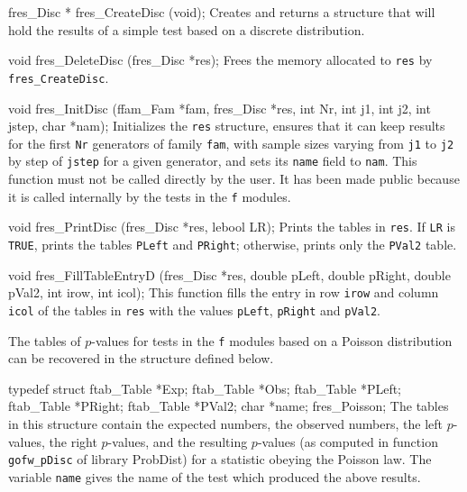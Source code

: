 fres_Disc * fres_CreateDisc (void);
\endcode
 \tab 
  Creates and returns a structure that will hold the results
  of a simple test based on a discrete distribution. 
 \endtab
\code


void fres_DeleteDisc (fres_Disc *res);
\endcode
 \tab 
  Frees the memory allocated to {\tt res} by {\tt fres\_CreateDisc}.
 \endtab
\code
\hide

void fres_InitDisc (ffam_Fam *fam, fres_Disc *res,
                    int Nr, int j1, int j2, int jstep, char *nam);
\endcode
 \tab 
   Initializes the {\tt res} structure, ensures that it can keep results
   for the first {\tt Nr} generators of family {\tt fam}, with sample sizes
   varying from {\tt j1} to {\tt j2} by step of {\tt jstep} for a given
   generator, and sets its {\tt name} field to {\tt nam}. This function
   must not be called directly by the user. It has been made public because
   it is called internally by the tests in the {\tt f} modules.
 \endtab
\code
\endhide

void fres_PrintDisc (fres_Disc *res, lebool LR);
\endcode
 \tab Prints the tables in {\tt res}. If {\tt LR} is {\tt TRUE}, prints the
   tables {\tt PLeft} and {\tt PRight}; otherwise, 
   prints only the {\tt PVal2} table.
 \endtab
\code


void fres_FillTableEntryD (fres_Disc *res, double pLeft, double pRight,
                           double pVal2, int irow, int icol);
\endcode
 \tab This function fills the entry in row {\tt irow} and column {\tt icol}
  of the tables in {\tt res} with the values  {\tt pLeft}, {\tt pRight}
  and {\tt pVal2}.
 \endtab





The tables of $p$-values for tests in the {\tt f} modules based on a
Poisson distribution can be recovered in the structure defined below.

\code

typedef struct {
   ftab_Table *Exp;
   ftab_Table *Obs;
   ftab_Table *PLeft;
   ftab_Table *PRight;
   ftab_Table *PVal2;
   char *name;
} fres_Poisson;
\endcode
 \tab
  The tables in this structure contain the expected numbers, the observed
  numbers, the left $p$-values, the right $p$-values, and the resulting
  $p$-values (as computed in function {\tt gofw\_pDisc} of library
   ProbDist) for a statistic obeying the Poisson law. The variable 
  {\tt name} gives the name of the test which produced the above results.
 \endtab
\code


